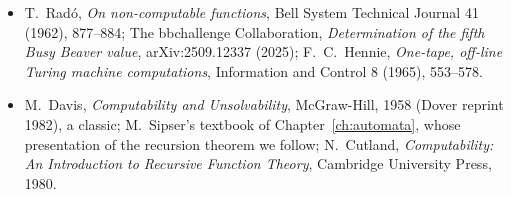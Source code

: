 \begin{itemize}
\item T.~Radó, \emph{On non-computable functions}, Bell System Technical Journal 41 (1962), 877--884; The bbchallenge Collaboration, \emph{Determination of the fifth Busy Beaver value}, arXiv:2509.12337 (2025); F.~C.~Hennie, \emph{One-tape, off-line Turing machine computations}, Information and Control 8 (1965), 553--578.
\item M.~Davis, \emph{Computability and Unsolvability}, McGraw-Hill, 1958 (Dover reprint 1982), a classic; M.~Sipser's textbook of Chapter~\ref{ch:automata}, whose presentation of the recursion theorem we follow; N.~Cutland, \emph{Computability: An Introduction to Recursive Function Theory}, Cambridge University Press, 1980.
\end{itemize}
